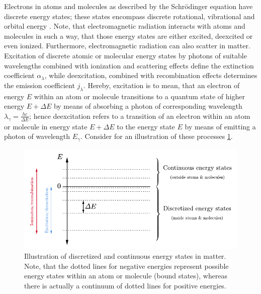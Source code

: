 \documentclass[a4paper,12pt]{report}
\def\lk#1{{\color{black}{#1}}}
\begin{document}
Electrons in atoms and molecules as described by the Schrödinger equation have discrete energy states; these states encompass discrete rotational, vibrational and orbital energy \lk{levels}. Note, that electromagnetic radiation interacts with atoms and molecules in such a way, that those energy states are either excited, deexcited or even ionized. Furthermore, electromagnetic radiation can also scatter in matter. Excitation of discrete atomic or molecular energy states by photons of suitable wavelengths combined with ionization and scattering effects define the extinction coefficient $\alpha_\lambda$, while deexcitation, combined with recombination effects determines the emission coefficient $j_\lambda$. Hereby, excitation is to mean, that an electron of energy $E$ within an atom or molecule transitions to a quantum state of higher energy $E + \Delta E$ by means of absorbing a photon of corresponding wavelength $\lambda_{\gamma} = \tfrac{hc}{\Delta E}$; hence deexcitation refers to a transition of an electron within an atom or molecule in energy state $E + \Delta E$ to the energy state $E$ by means of emitting a photon of wavelength $E_\gamma$. Consider for an illustration of these processes \cref{fig:energylevels}.
\begin{figure}[h]
\centering
\includegraphics[width=12cm]{figures/energystates.pdf}
\caption{Illustration of discretized and continuous energy states in matter. Note, that the dotted lines for negative energies represent possible energy states within an atom or molecule (bound states), whereas there is actually a continuum of dotted lines for positive energies.}
\label{fig:energylevels}
\end{figure}
\end{document}

